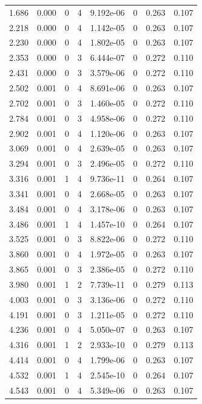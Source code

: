\documentclass[preview]{standalone}
\begin{document}
{{\begin{tabular}{L{1.2cm}C{1.2cm} C{0.3cm}C{0.5cm} C{1.4cm}C{1.4cm} C{1.4cm}C{1.4cm}}
  1.686  &  0.000  & 0     &  4 &  9.192e-06  & 0  & 0.263 &  0.107   \\ 
  2.218  &  0.000  & 0     &  4 &  1.142e-05  & 0  & 0.263 &  0.107   \\ 
  2.230  &  0.000  & 0     &  4 &  1.802e-05  & 0  & 0.263 &  0.107   \\ 
  2.353  &  0.000  & 0     &  3 &  6.444e-07  & 0  & 0.272 &  0.110   \\ 
  2.431  &  0.000  & 0     &  3 &  3.579e-06  & 0  & 0.272 &  0.110   \\ 
  2.502  &  0.001  & 0     &  4 &  8.691e-06  & 0  & 0.263 &  0.107   \\ 
  2.702  &  0.001  & 0     &  3 &  1.460e-05  & 0  & 0.272 &  0.110   \\ 
  2.784  &  0.001  & 0     &  3 &  4.958e-06  & 0  & 0.272 &  0.110   \\ 
  2.902  &  0.001  & 0     &  4 &  1.120e-06  & 0  & 0.263 &  0.107   \\ 
  3.069  &  0.001  & 0     &  4 &  2.639e-05  & 0  & 0.263 &  0.107   \\ 
  3.294  &  0.001  & 0     &  3 &  2.496e-05  & 0  & 0.272 &  0.110   \\ 
  3.316  &  0.001  & 1     &  4 &  9.736e-11  & 0  & 0.264 &  0.107   \\ 
  3.341  &  0.001  & 0     &  4 &  2.668e-05  & 0  & 0.263 &  0.107   \\ 
  3.484  &  0.001  & 0     &  4 &  3.178e-06  & 0  & 0.263 &  0.107   \\ 
  3.486  &  0.001  & 1     &  4 &  1.457e-10  & 0  & 0.264 &  0.107   \\ 
  3.525  &  0.001  & 0     &  3 &  8.822e-06  & 0  & 0.272 &  0.110   \\ 
  3.860  &  0.001  & 0     &  4 &  1.972e-05  & 0  & 0.263 &  0.107   \\ 
  3.865  &  0.001  & 0     &  3 &  2.386e-05  & 0  & 0.272 &  0.110   \\ 
  3.980  &  0.001  & 1     &  2 &  7.739e-11  & 0  & 0.279 &  0.113   \\ 
  4.003  &  0.001  & 0     &  3 &  3.136e-06  & 0  & 0.272 &  0.110   \\ 
  4.191  &  0.001  & 0     &  3 &  1.211e-05  & 0  & 0.272 &  0.110   \\ 
  4.236  &  0.001  & 0     &  4 &  5.050e-07  & 0  & 0.263 &  0.107   \\ 
  4.316  &  0.001  & 1     &  2 &  2.933e-10  & 0  & 0.279 &  0.113   \\ 
  4.414  &  0.001  & 0     &  4 &  1.799e-06  & 0  & 0.263 &  0.107   \\ 
  4.532  &  0.001  & 1     &  4 &  2.545e-10  & 0  & 0.264 &  0.107   \\ 
  4.543  &  0.001  & 0     &  4 &  5.349e-06  & 0  & 0.263 &  0.107   \\ 
\hline 
\end{tabular} 

}}
\end{document}
